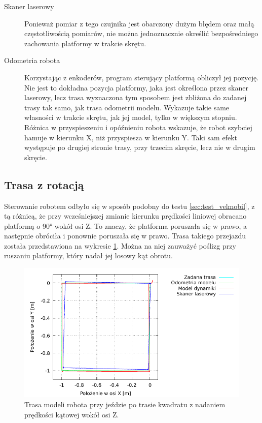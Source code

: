 \begin{description}
				\item[Skaner laserowy] Ponieważ pomiar z tego czujnika jest obarczony dużym błędem oraz małą częstotliwością pomiarów, nie można jednoznacznie określić bezpośredniego zachowania platformy w trakcie skrętu.
				\item[Odometria robota] Korzystając z enkoderów, program sterujący platformą obliczył jej pozycję. Nie jest to dokładna pozycja platformy, jaka jest określona przez skaner laserowy, lecz trasa wyznaczona tym sposobem jest zbliżona do zadanej trasy tak samo, jak trasa odometrii modelu. 
				Wykazuje takie same własności w trakcie skrętu, jak jej model, tylko w większym stopniu. Różnica w przyspieszeniu i opóźnieniu robota wskazuje, że 
				robot szybciej hamuje w kierunku X, niż przyspiesza w kierunku Y. Taki sam efekt występuje po drugiej stronie trasy, przy trzecim skręcie, lecz nie w drugim skręcie.
			\end{description}

	\subsection{Trasa z rotacją}
		Sterowanie robotem odbyło się w sposób podobny do testu \ref{sec:test_velmobil}, z tą różnicą, że przy wcześniejszej zmianie kierunku prędkości liniowej obracano platformą o 90° wokół osi Z. To znaczy, że platforma poruszała się w prawo, a następnie obróciła i ponownie poruszała się w prawo.
		Trasa takiego przejazdu została przedstawiona na wykresie \ref{plot:velmobil_rot_xy}.
		Można na niej zauważyć poślizg przy ruszaniu platformy, który nadał jej losowy kąt obrotu.
		
		\begin{figure}[H]
			\centering
			\includegraphics[width=\textwidth]{plots/velmobil_rot_xy.pdf}
				\caption{Trasa modeli robota przy jeździe po trasie kwadratu z nadaniem prędkości kątowej wokół osi Z.}
			\label{plot:velmobil_rot_xy}
		\end{figure}
		

